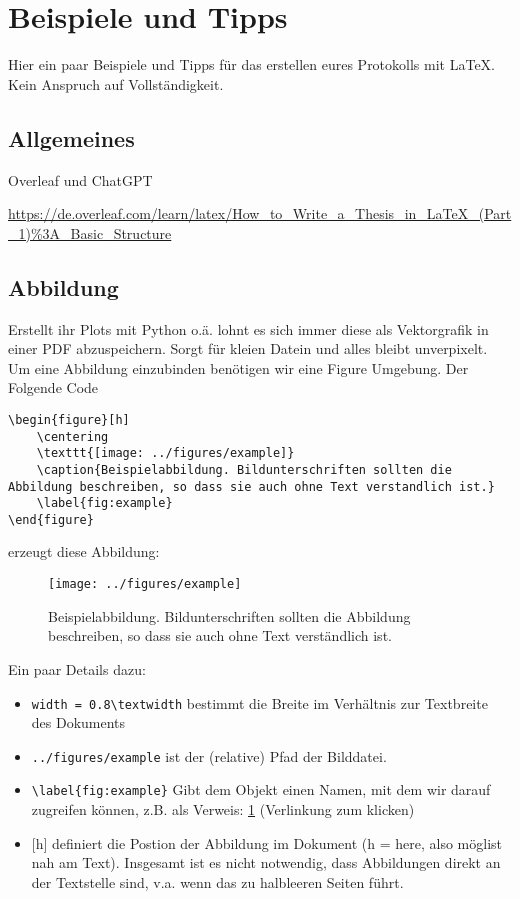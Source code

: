 \documentclass[twoside, 11pt, ngerman, a4paper, biblography=totoc]{scrartcl}
\begin{document}
\section{Beispiele und Tipps}
Hier ein paar Beispiele und Tipps für das erstellen eures Protokolls mit \LaTeX. Kein Anspruch auf Vollständigkeit.

\subsection{Allgemeines}
Overleaf und ChatGPT

\url{https://de.overleaf.com/learn/latex/How_to_Write_a_Thesis_in_LaTeX_(Part_1)\%3A_Basic_Structure}

\subsection{Abbildung}
Erstellt ihr Plots mit Python o.ä. lohnt es sich immer diese als Vektorgrafik in einer PDF abzuspeichern. Sorgt für kleien Datein und alles bleibt unverpixelt.\\

Um eine Abbildung einzubinden benötigen wir eine Figure Umgebung. Der Folgende Code
\begin{lstlisting}[language=Tex]
\begin{figure}[h]
    \centering
    \texttt{[image: ../figures/example]}
    \caption{Beispielabbildung. Bildunterschriften sollten die Abbildung beschreiben, so dass sie auch ohne Text verstandlich ist.}
    \label{fig:example}
\end{figure}
\end{lstlisting}
erzeugt diese Abbildung:
\begin{figure}[h]
    \centering
    \texttt{[image: ../figures/example]}
    \caption{Beispielabbildung. Bildunterschriften sollten die Abbildung beschreiben, so dass sie auch ohne Text verständlich ist.}
    \label{fig:example}
\end{figure}

Ein paar Details dazu:
\begin{itemize}
	\item \texttt{width = 0.8\textbackslash textwidth} bestimmt die Breite im Verhältnis zur Textbreite des Dokuments
	\item \texttt{../figures/example} ist der (relative) Pfad der Bilddatei. 
	\item \texttt{\textbackslash label\{fig:example\}} Gibt dem Objekt einen Namen, mit dem wir darauf zugreifen können, z.B. als Verweis: \cref{fig:example} (Verlinkung zum klicken)
	\item $[$h$]$ definiert die Postion der Abbildung im Dokument (h = here, also möglist nah am Text). Insgesamt ist es nicht notwendig, dass Abbildungen direkt an der Textstelle sind, v.a. wenn das zu halbleeren Seiten führt.
\end{itemize}
\end{document}
